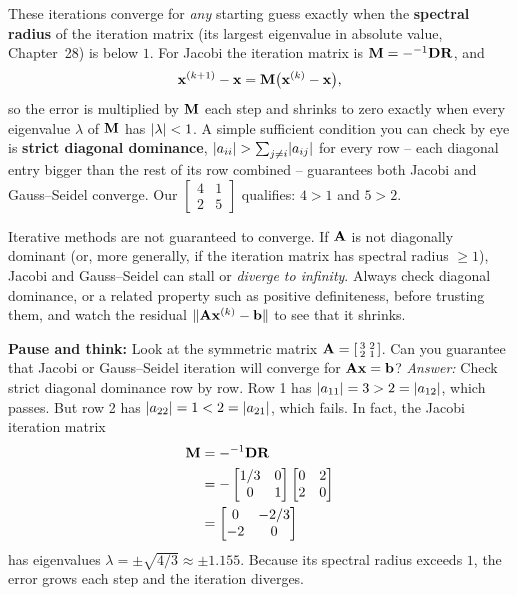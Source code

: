\begin{formalbox}
These iterations converge for \emph{any} starting guess exactly when the
\textbf{spectral radius} of the iteration matrix (its largest eigenvalue in absolute
value, Chapter~28) is below $1$. For Jacobi the iteration matrix is
$\mathbf{M}=-^{-1}{\mathbf{D}}\mathbf{R}$, and
\[
  \mathbf{x}^{(k+1)}-\mathbf{x} = \mathbf{M}\bigl(\mathbf{x}^{(k)}-\mathbf{x}\bigr),
\]
so the error is multiplied by $\mathbf{M}$ each step and shrinks to zero exactly when every
eigenvalue $\lambda$ of $\mathbf{M}$ has $\lvert\lambda\rvert<1$. A simple sufficient condition
you can check by eye is \textbf{strict diagonal dominance},
$\lvert a_{ii}\rvert > \sum_{j\ne i}\lvert a_{ij}\rvert$ for every row -- each diagonal entry bigger
than the rest of its row combined -- guarantees both Jacobi and Gauss--Seidel converge.
Our $\left[\begin{smallmatrix}4&1\\2&5\end{smallmatrix}\right]$ qualifies: $4>1$ and
$5>2$.
\end{formalbox}

\begin{trapbox}
Iterative methods are not guaranteed to converge. If $\mathbf{A}$ is not diagonally
dominant (or, more generally, if the iteration matrix has spectral radius $\ge 1$),
Jacobi and Gauss--Seidel can stall or \emph{diverge to infinity}. Always check
diagonal dominance, or a related property such as positive definiteness, before
trusting them, and watch the residual $\lVert\mathbf{A}\mathbf{x}^{(k)}-\mathbf{b}\rVert$ to see that
it shrinks.
\end{trapbox}

\begin{recoverybox}
\textbf{Pause and think:} Look at the symmetric matrix
$\mathbf{A} = \left[\begin{smallmatrix} 3 & 2 \\ 2 & 1 \end{smallmatrix}\right]$. Can you
guarantee that Jacobi or Gauss--Seidel iteration will converge for
$\mathbf{A}\mathbf{x}=\mathbf{b}$?
\emph{Answer:} Check strict diagonal dominance row by row. Row 1 has
$\lvert a_{11}\rvert = 3 > 2 = \lvert a_{12}\rvert$, which passes. But row 2 has
$\lvert a_{22}\rvert = 1 < 2 = \lvert a_{21}\rvert$, which fails. In fact, the Jacobi iteration matrix
\begin{align*}
  \mathbf{M} &= -^{-1}{\mathbf{D}}\mathbf{R} \\
          &= -\begin{bmatrix} 1/3 & 0 \\ 0 & 1 \end{bmatrix}\begin{bmatrix} 0 & 2 \\ 2 & 0 \end{bmatrix} \\
          &= \begin{bmatrix} 0 & -2/3 \\ -2 & 0 \end{bmatrix}
\end{align*}
has eigenvalues $\lambda = \pm\sqrt{4/3} \approx \pm 1.155$. Because its spectral radius
exceeds $1$, the error grows each step and the iteration diverges.
\end{recoverybox}

